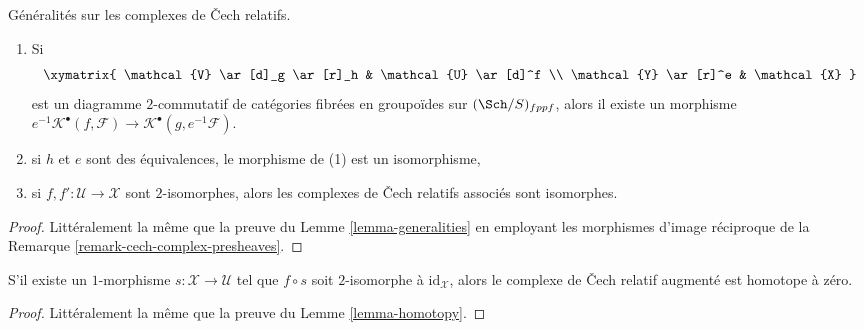 \begin{lemma}
\label{lemma-generalities-sheafified}
Généralités sur les complexes de {\v C}ech relatifs.
\begin{enumerate}
\item Si
$$
\xymatrix{
\mathcal{V} \ar[d]_g \ar[r]_h & \mathcal{U} \ar[d]^f \\
\mathcal{Y} \ar[r]^e & \mathcal{X}
}
$$
est un diagramme $2$-commutatif de catégories fibrées en groupoïdes sur
$(\Sch/S)_{fppf}$, alors il existe un morphisme
$e^{-1}\mathcal{K}^\bullet(f, \mathcal{F}) \to
\mathcal{K}^\bullet(g, e^{-1}\mathcal{F})$.
\item si $h$ et $e$ sont des équivalences, le morphisme de (1) est un isomorphisme,
\item si $f, f' : \mathcal{U} \to \mathcal{X}$ sont $2$-isomorphes, alors
les complexes de {\v C}ech relatifs associés sont isomorphes.
\end{enumerate}
\end{lemma}

\begin{proof}
Littéralement la même que la preuve du
Lemme \ref{lemma-generalities}
en employant les morphismes d'image réciproque de la
Remarque \ref{remark-cech-complex-presheaves}.
\end{proof}

\begin{lemma}
\label{lemma-homotopy-sheafified}
S'il existe un $1$-morphisme $s : \mathcal{X} \to \mathcal{U}$
tel que $f \circ s$ soit $2$-isomorphe à $\text{id}_\mathcal{X}$,
alors le complexe de {\v C}ech relatif augmenté est homotope à zéro.
\end{lemma}

\begin{proof}
Littéralement la même que la preuve du
Lemme \ref{lemma-homotopy}.
\end{proof}

